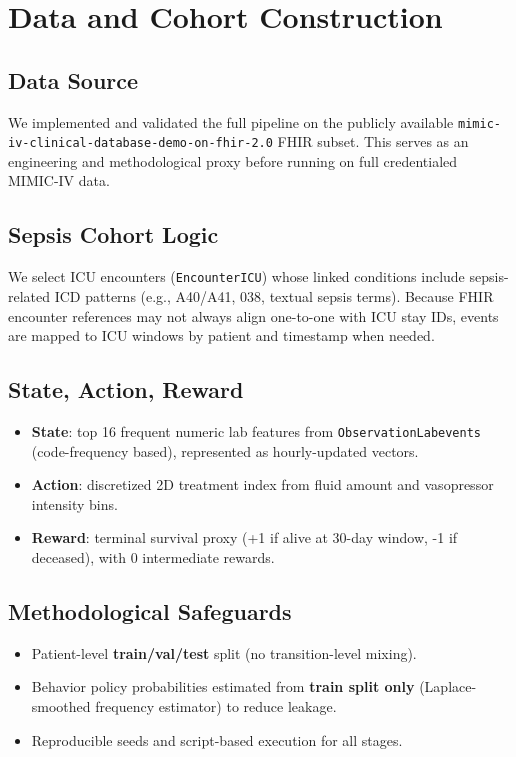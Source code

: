 \documentclass[10pt]{article}
\begin{document}
\section{Data and Cohort Construction}
\subsection{Data Source}
We implemented and validated the full pipeline on the publicly available \texttt{mimic-iv-clinical-database-demo-on-fhir-2.0} FHIR subset. This serves as an engineering and methodological proxy before running on full credentialed MIMIC-IV data.

\subsection{Sepsis Cohort Logic}
We select ICU encounters (\texttt{EncounterICU}) whose linked conditions include sepsis-related ICD patterns (e.g., A40/A41, 038, textual sepsis terms). Because FHIR encounter references may not always align one-to-one with ICU stay IDs, events are mapped to ICU windows by patient and timestamp when needed.

\subsection{State, Action, Reward}
\begin{itemize}[leftmargin=*]
  \item \textbf{State}: top 16 frequent numeric lab features from \texttt{ObservationLabevents} (code-frequency based), represented as hourly-updated vectors.
  \item \textbf{Action}: discretized 2D treatment index from fluid amount and vasopressor intensity bins.
  \item \textbf{Reward}: terminal survival proxy (+1 if alive at 30-day window, -1 if deceased), with 0 intermediate rewards.
\end{itemize}

\subsection{Methodological Safeguards}
\begin{itemize}[leftmargin=*]
  \item Patient-level \textbf{train/val/test} split (no transition-level mixing).
  \item Behavior policy probabilities estimated from \textbf{train split only} (Laplace-smoothed frequency estimator) to reduce leakage.
  \item Reproducible seeds and script-based execution for all stages.
\end{itemize}
\end{document}
